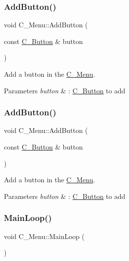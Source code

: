 \subsubsection{\texorpdfstring{Add\+Button()}{AddButton()}\hspace{0.1cm}{\footnotesize\ttfamily [1/2]}}
{\footnotesize\ttfamily void C\+\_\+\+Menu\+::\+Add\+Button (\begin{DoxyParamCaption}\item[{const \hyperlink{classC__Button}{C\+\_\+\+Button} \&}]{button }\end{DoxyParamCaption})}



Add a button in the \hyperlink{classC__Menu}{C\+\_\+\+Menu}. 


\begin{DoxyParams}{Parameters}
{\em button} & \+: \hyperlink{classC__Button}{C\+\_\+\+Button} to add \\
\hline
\end{DoxyParams}
\mbox{\label{classC__Menu_a9a4f7a0022f39f35b7af9c5d2b6f31ec}} 
\subsubsection{\texorpdfstring{Add\+Button()}{AddButton()}\hspace{0.1cm}{\footnotesize\ttfamily [2/2]}}
{\footnotesize\ttfamily void C\+\_\+\+Menu\+::\+Add\+Button (\begin{DoxyParamCaption}\item[{const \hyperlink{classC__Button}{C\+\_\+\+Button} \&}]{button }\end{DoxyParamCaption})}



Add a button in the \hyperlink{classC__Menu}{C\+\_\+\+Menu}. 


\begin{DoxyParams}{Parameters}
{\em button} & \+: \hyperlink{classC__Button}{C\+\_\+\+Button} to add \\
\hline
\end{DoxyParams}
\mbox{\label{classC__Menu_a9529be708fad2c6deca21034bc37f59d}} 
\subsubsection{\texorpdfstring{Main\+Loop()}{MainLoop()}\hspace{0.1cm}{\footnotesize\ttfamily [1/2]}}
{\footnotesize\ttfamily void C\+\_\+\+Menu\+::\+Main\+Loop (\begin{DoxyParamCaption}{ }\end{DoxyParamCaption})}



